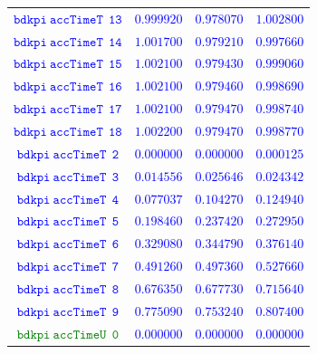 \documentclass[10pt,a4paper]{article}
\begin{document}
\begin{table}[h!]
{\begin{tabular}{cccc}
\textcolor{blue}{$\mathtt{bdkpi~accTimeT~~13}$} & \textcolor{blue}{$0.999920$}& \textcolor{blue}{$0.978070$}& \textcolor{blue}{$1.002800$}\\
\textcolor{blue}{$\mathtt{bdkpi~accTimeT~~14}$} & \textcolor{blue}{$1.001700$}& \textcolor{blue}{$0.979210$}& \textcolor{blue}{$0.997660$}\\
\textcolor{blue}{$\mathtt{bdkpi~accTimeT~~15}$} & \textcolor{blue}{$1.002100$}& \textcolor{blue}{$0.979430$}& \textcolor{blue}{$0.999060$}\\
\textcolor{blue}{$\mathtt{bdkpi~accTimeT~~16}$} & \textcolor{blue}{$1.002100$}& \textcolor{blue}{$0.979460$}& \textcolor{blue}{$0.998690$}\\
\textcolor{blue}{$\mathtt{bdkpi~accTimeT~~17}$} & \textcolor{blue}{$1.002100$}& \textcolor{blue}{$0.979470$}& \textcolor{blue}{$0.998740$}\\
\textcolor{blue}{$\mathtt{bdkpi~accTimeT~~18}$} & \textcolor{blue}{$1.002200$}& \textcolor{blue}{$0.979470$}& \textcolor{blue}{$0.998770$}\\
\textcolor{blue}{$\mathtt{bdkpi~accTimeT~~2}$} & \textcolor{blue}{$0.000000$}& \textcolor{blue}{$0.000000$}& \textcolor{blue}{$0.000125$}\\
\textcolor{blue}{$\mathtt{bdkpi~accTimeT~~3}$} & \textcolor{blue}{$0.014556$}& \textcolor{blue}{$0.025646$}& \textcolor{blue}{$0.024342$}\\
\textcolor{blue}{$\mathtt{bdkpi~accTimeT~~4}$} & \textcolor{blue}{$0.077037$}& \textcolor{blue}{$0.104270$}& \textcolor{blue}{$0.124940$}\\
\textcolor{blue}{$\mathtt{bdkpi~accTimeT~~5}$} & \textcolor{blue}{$0.198460$}& \textcolor{blue}{$0.237420$}& \textcolor{blue}{$0.272950$}\\
\textcolor{blue}{$\mathtt{bdkpi~accTimeT~~6}$} & \textcolor{blue}{$0.329080$}& \textcolor{blue}{$0.344790$}& \textcolor{blue}{$0.376140$}\\
\textcolor{blue}{$\mathtt{bdkpi~accTimeT~~7}$} & \textcolor{blue}{$0.491260$}& \textcolor{blue}{$0.497360$}& \textcolor{blue}{$0.527660$}\\
\textcolor{blue}{$\mathtt{bdkpi~accTimeT~~8}$} & \textcolor{blue}{$0.676350$}& \textcolor{blue}{$0.677730$}& \textcolor{blue}{$0.715640$}\\
\textcolor{blue}{$\mathtt{bdkpi~accTimeT~~9}$} & \textcolor{blue}{$0.775090$}& \textcolor{blue}{$0.753240$}& \textcolor{blue}{$0.807400$}\\
\textcolor{Green}{$\mathtt{bdkpi~accTimeU~~0}$} & \textcolor{blue}{$0.000000$}& \textcolor{blue}{$0.000000$}& \textcolor{blue}{$0.000000$}\\

\end{tabular}}
\end{table}
\end{document}
